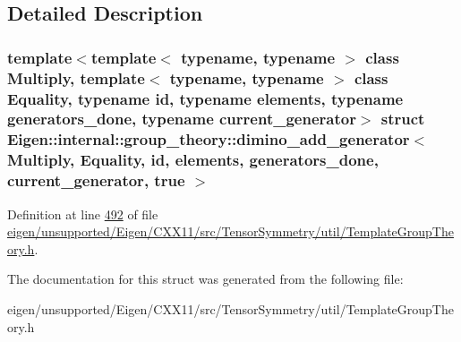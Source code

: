 \subsection{Detailed Description}
\subsubsection*{template$<$template$<$ typename, typename $>$ class Multiply, template$<$ typename, typename $>$ class Equality, typename id, typename elements, typename generators\+\_\+done, typename current\+\_\+generator$>$\newline
struct Eigen\+::internal\+::group\+\_\+theory\+::dimino\+\_\+add\+\_\+generator$<$ Multiply, Equality, id, elements, generators\+\_\+done, current\+\_\+generator, true $>$}



Definition at line \hyperlink{eigen_2unsupported_2_eigen_2_c_x_x11_2src_2_tensor_symmetry_2util_2_template_group_theory_8h_source_l00492}{492} of file \hyperlink{eigen_2unsupported_2_eigen_2_c_x_x11_2src_2_tensor_symmetry_2util_2_template_group_theory_8h_source}{eigen/unsupported/\+Eigen/\+C\+X\+X11/src/\+Tensor\+Symmetry/util/\+Template\+Group\+Theory.\+h}.



The documentation for this struct was generated from the following file\+:\begin{DoxyCompactItemize}
\item 
eigen/unsupported/\+Eigen/\+C\+X\+X11/src/\+Tensor\+Symmetry/util/\+Template\+Group\+Theory.\+h\end{DoxyCompactItemize}

